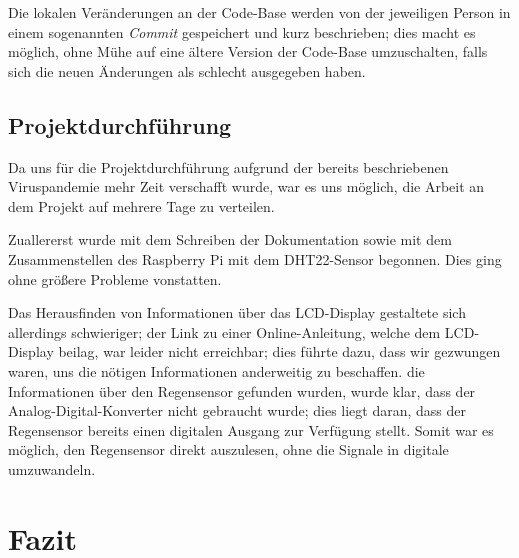 \documentclass[a4paper,12pt]{article}
\begin{document}
Die lokalen Veränderungen an der Code-Base werden von der jeweiligen Person in einem sogenannten \textit{Commit} gespeichert und kurz beschrieben; dies macht es möglich, ohne Mühe auf eine ältere Version der Code-Base umzuschalten, falls sich die neuen Änderungen als schlecht ausgegeben haben.

\subsection{Projektdurchführung}
Da uns für die Projektdurchführung aufgrund der bereits beschriebenen Viruspandemie mehr Zeit verschafft wurde, war es uns möglich, die Arbeit an dem Projekt auf mehrere Tage zu verteilen. 

Zuallererst wurde mit dem Schreiben der Dokumentation sowie mit dem Zusammenstellen des Raspberry Pi mit dem DHT22-Sensor begonnen. Dies ging ohne größere Probleme vonstatten.

Das Herausfinden von Informationen über das LCD-Display gestaltete sich allerdings schwieriger; der Link zu einer Online-Anleitung, welche dem LCD-Display beilag, war leider nicht erreichbar; dies führte dazu, dass wir gezwungen waren, uns die nötigen Informationen anderweitig zu beschaffen.
die Informationen über den Regensensor gefunden wurden, wurde klar, dass der Analog-Digital-Konverter nicht gebraucht wurde; dies liegt daran, dass der Regensensor bereits einen digitalen Ausgang zur Verfügung stellt. Somit war es möglich, den Regensensor direkt auszulesen, ohne die Signale in digitale umzuwandeln.

\pagebreak
\section{Fazit}
\end{document}
